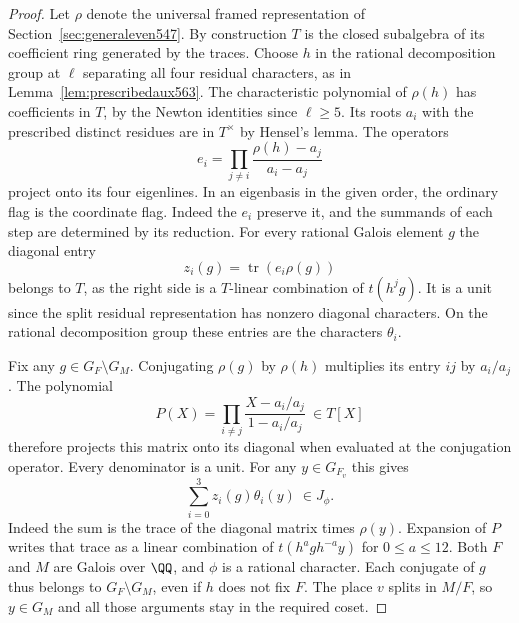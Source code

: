 \documentclass[a4paper,11pt]{article}
\theoremstyle{definition}
\theoremstyle{remark}
\numberwithin{equation}{section}
\begin{document}
\begin{proof}
Let \(\rho\) denote the universal framed representation of
Section~\ref{sec:generaleven547}. By construction \(T\)
is the closed subalgebra of its coefficient ring generated
by the traces. Choose \(h\) in the rational decomposition
group at \(\ell\) separating all four residual characters,
as in Lemma~\ref{lem:prescribedaux563}. The characteristic
polynomial of \(\rho(h)\) has coefficients in \(T\), by the
Newton identities since \(\ell\ge5\). Its roots \(a_i\)
with the prescribed distinct residues are in \(T^\times\)
by Hensel's lemma. The operators
\[
         e_i=\prod_{j\ne i}
                   \frac{\rho(h)-a_j}{a_i-a_j}
\]
project onto its four eigenlines. In an eigenbasis in the
given order, the ordinary flag is the coordinate flag.
Indeed the \(e_i\) preserve it, and the summands of each
step are determined by its reduction. For every rational
Galois element \(g\) the diagonal entry
\[
                  z_i(g)=\operatorname{tr}(e_i\rho(g))
\]
belongs to \(T\), as the right side is a \(T\)-linear
combination of \(t(h^j g)\). It is a unit since the split
residual representation has nonzero diagonal characters.
On the rational decomposition group these entries are
the characters \(\theta_i\).

Fix any \(g\in G_F\setminus G_M\). Conjugating \(\rho(g)\)
by \(\rho(h)\) multiplies its entry \(ij\) by \(a_i/a_j\).
The polynomial
\[
      P(X)=\prod_{i\ne j}\frac{X-a_i/a_j}{1-a_i/a_j}
                      \ \in T[X]
\]
therefore projects this matrix onto its diagonal when evaluated
at the conjugation operator. Every denominator is a unit.
For any \(y\in G_{F_v}\) this gives
\[
              \sum_{i=0}^3 z_i(g)\theta_i(y)\ \in J_\phi .
\]
Indeed the sum is the trace of the diagonal matrix times
\(\rho(y)\). Expansion of \(P\) writes that trace as a
linear combination of \(t(h^a g h^{-a}y)\) for \(0\le a\le12\).
Both \(F\) and \(M\) are Galois over \(\QQ\), and \(\phi\)
is a rational character. Each conjugate of \(g\) thus belongs
to \(G_F\setminus G_M\), even if \(h\) does not fix \(F\).
The place \(v\) splits in \(M/F\), so \(y\in G_M\) and all
those arguments stay in the required coset.


\end{proof}
\end{document}
